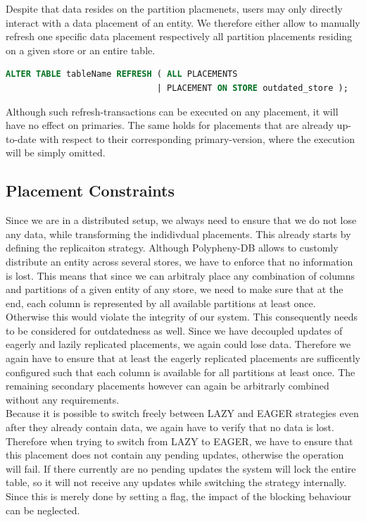 Despite that data resides on the partition placmenets, users may only directly interact with a data placement of an entity.
We therefore either allow to manually refresh one specific data placement respectively all partition placements residing on a given store or an entire table.

\begin{lstlisting}[language=sql, caption={SQL Statement Syntax for an On-Demand Refresh Operation},label={lst:refresh}]
ALTER TABLE tableName REFRESH ( ALL PLACEMENTS 
                              | PLACEMENT ON STORE outdated_store );
\end{lstlisting}

Although such refresh-transactions can be executed on any placement, it will have no effect on primaries. 
The same holds for placements that are already up-to-date with respect to their corresponding primary-version, where the execution will be simply omitted.





\subsection{Placement Constraints}
\label{sec:constraints}

Since we are in a distributed setup, we always need to ensure that we do not lose any data, while transforming the indidivdual placements. 
This already starts by defining the replicaiton strategy. Although Polypheny-DB allows to customly distribute an entity across several stores, we have to enforce that no 
information is lost. This means that since we can arbitraly place any combination of columns and partitions of a given entity of any store, we need to make sure that at the end, 
each column is represented by all available partitions at least once. Otherwise this would violate the integrity of our system. 
This consequently needs to be considered for outdatedness as well. Since we have decoupled updates of eagerly and lazily replicated placements, we again could lose data. 
Therefore we again have to ensure that at least the eagerly replicated placements are sufficently configured such that each column is available for all partitions at least once.
The remaining secondary placements however can again be arbitrarly combined without any requirements.\\
Because it is possible to switch freely between LAZY and EAGER strategies even after they already contain data, we again have to verify that no data is lost.
Therefore when trying to switch from LAZY to EAGER, we have to ensure that this placement does not contain any pending updates, otherwise the operation will fail.
If there currently are no pending updates the system will lock the entire table, so it will not receive any updates while switching the strategy internally. 
Since this is merely done by setting a flag, the impact of the blocking behaviour can be neglected.\\

